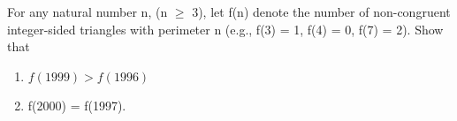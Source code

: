 \item For any natural number n, (n $\geq$ 3), let f(n) denote the number of non-congruent integer-sided triangles with perimeter n (e.g., f(3) = 1, f(4) = 0, f(7) = 2). Show that
\begin{enumerate}
\item $f(1999) > f(1996)$
\item f(2000) = f(1997).
\end{enumerate}








